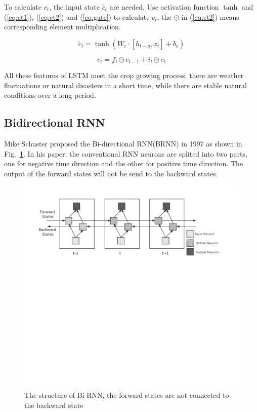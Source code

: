 \documentclass[conference, a4paper]{IEEEtran}
\begin{document}
    To calculate $c_t$, the input state $\widetilde{c_t}$ are needed. Use activation function $\tanh$ and (\ref{eq:ct1}), (\ref{eq:ct2}) and (\ref{eq:gate}) to calculate $c_t$, the $\odot$ in (\ref{eq:ct2}) means corresponding element multiplication.

    \begin{equation}
      \tilde{c}_t=\tanh \left( W_c\cdot \left[ h_{t-q},x_t \right] +b_c \right)
      \label{eq:ct1}
    \end{equation}

    \begin{equation}
      c_t=f_t\odot c_{t-1}+i_t\odot c_t
      \label{eq:ct2}
    \end{equation}

    All these features of LSTM meet the crop growing process, there are weather fluctuations or natural disasters in a short time, while there are stable natural conditions over a long period.

  \subsection{Bidirectional RNN}
    Mike Schuster \cite{schusterBidirectionalRecurrentNeural1997} proposed the Bi-directional RNN(BRNN) in 1997 as shown in Fig.~\ref{fig:BRNN}. In his paper, the conventional RNN neurons are splited into two parts, one for negative time direction and the other for positive time direction. The output of the forward states will not be send to the backward states. 

    \begin{figure}[htbp]
      \centerline{\includegraphics[width=\linewidth]{figures/BRNN.pdf}}
      \caption{The structure of Bi-RNN, the forward states are not connected to the backward state}
      \label{fig:BRNN}
    \end{figure}
\end{document}

